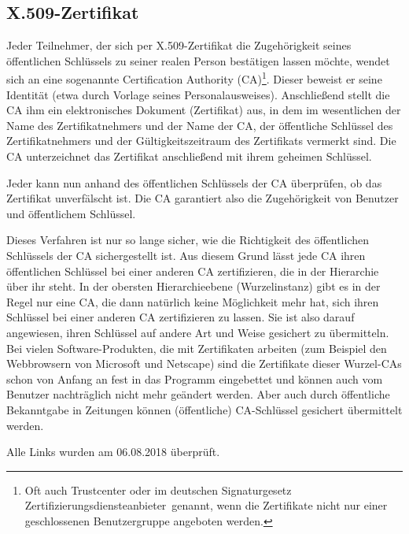 \begin{refsegment}
\subsection{X.509-Zertifikat}
Jeder Teilnehmer, der sich per X.509-Zertifikat \cite{X.509}
die Zugehörigkeit seines öffentlichen Schlüssels zu seiner realen Person
bestätigen lassen möchte, wendet sich an eine sogenannte
 Certification Authority (CA)\footnote{%
Oft auch Trustcenter oder im deutschen Signaturgesetz
\glqq Zertifizierungsdiensteanbieter\grqq\ genannt, wenn die Zertifikate nicht
nur einer geschlossenen Benutzergruppe angeboten werden.
}.
Dieser beweist er seine Identität (etwa durch Vorlage seines
Personalausweises). Anschließend stellt die CA ihm ein elektronisches
Dokument (Zertifikat) aus, in dem im wesentlichen der Name des
Zertifikatnehmers und der Name der CA, der öffentliche Schlüssel des
Zertifikatnehmers und der Gültigkeitszeitraum des Zertifikats vermerkt
sind. Die CA unterzeichnet das Zertifikat anschließend mit ihrem geheimen
Schlüssel.

Jeder kann nun anhand des öffentlichen Schlüssels der CA überprüfen, ob
das Zertifikat unverfälscht ist. Die CA garantiert also die Zugehörigkeit
von Benutzer und öffentlichem Schlüssel.

Dieses Verfahren ist nur so lange sicher, wie die Richtigkeit des
öffentlichen Schlüssels der CA sichergestellt ist. Aus diesem Grund lässt
jede CA ihren öffentlichen Schlüssel bei einer anderen CA zertifizieren,
die in der Hierarchie über ihr steht. In der obersten Hierarchieebene
(Wurzelinstanz) gibt es in der Regel nur eine CA, die dann natürlich keine
Möglichkeit mehr hat, sich ihren Schlüssel bei einer anderen CA
zertifizieren zu lassen. Sie ist also darauf angewiesen, ihren Schlüssel
auf andere Art und Weise gesichert zu übermitteln. Bei vielen
Software-Produkten, die mit Zertifikaten arbeiten (zum Beispiel den
Webbrowsern von Microsoft und Netscape) sind die Zertifikate dieser
Wurzel-CAs schon von Anfang an fest in das Programm eingebettet und können
auch vom Benutzer nachträglich nicht mehr geändert werden. Aber auch durch
öffentliche Bekanntgabe in Zeitungen können (öffentliche) CA-Schlüssel
gesichert übermittelt werden.



\printbibliography[%
	heading=subbibintoc,
	title={Literatur zu Kapitel \thechapter},
	segment=\therefsegment,
]


Alle Links wurden am 06.08.2018 überprüft.

\end{refsegment}

